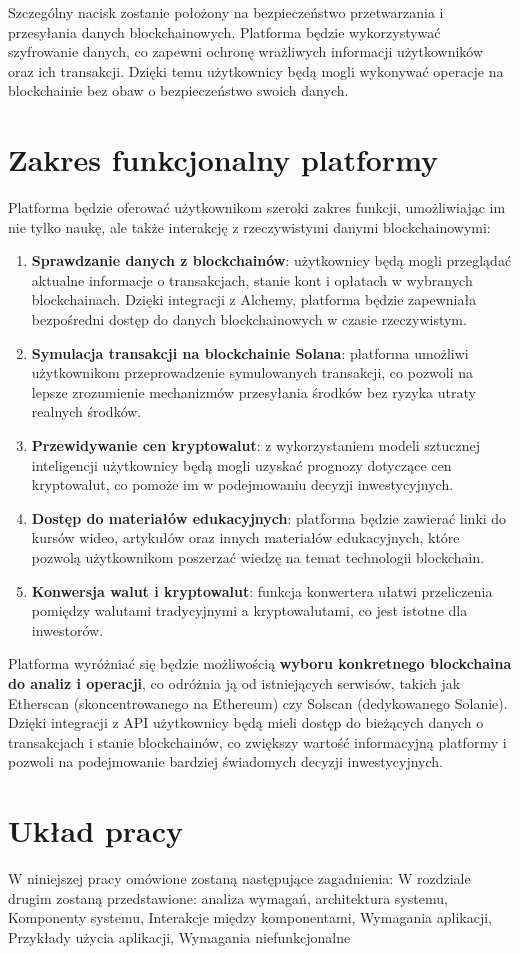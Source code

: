 Szczególny nacisk zostanie położony na bezpieczeństwo przetwarzania i przesyłania danych blockchainowych. Platforma będzie wykorzystywać szyfrowanie danych, co zapewni ochronę wrażliwych informacji użytkowników oraz ich transakcji. Dzięki temu użytkownicy będą mogli wykonywać operacje na blockchainie bez obaw o bezpieczeństwo swoich danych.

\section{Zakres funkcjonalny platformy}

Platforma będzie oferować użytkownikom szeroki zakres funkcji, umożliwiając im nie tylko naukę, ale także interakcję z rzeczywistymi danymi blockchainowymi:

\begin{enumerate} \item \textbf{Sprawdzanie danych z blockchainów}: użytkownicy będą mogli przeglądać aktualne informacje o transakcjach, stanie kont i opłatach w wybranych blockchainach. Dzięki integracji z Alchemy, platforma będzie zapewniała bezpośredni dostęp do danych blockchainowych w czasie rzeczywistym. \item \textbf{Symulacja transakcji na blockchainie Solana}: platforma umożliwi użytkownikom przeprowadzenie symulowanych transakcji, co pozwoli na lepsze zrozumienie mechanizmów przesyłania środków bez ryzyka utraty realnych środków. \item \textbf{Przewidywanie cen kryptowalut}: z wykorzystaniem modeli sztucznej inteligencji użytkownicy będą mogli uzyskać prognozy dotyczące cen kryptowalut, co pomoże im w podejmowaniu decyzji inwestycyjnych. \item \textbf{Dostęp do materiałów edukacyjnych}: platforma będzie zawierać linki do kursów wideo, artykułów oraz innych materiałów edukacyjnych, które pozwolą użytkownikom poszerzać wiedzę na temat technologii blockchain. \item \textbf{Konwersja walut i kryptowalut}: funkcja konwertera ułatwi przeliczenia pomiędzy walutami tradycyjnymi a kryptowalutami, co jest istotne dla inwestorów. \end{enumerate}

Platforma wyróżniać się będzie możliwością \textbf{wyboru konkretnego blockchaina do analiz i operacji}, co odróżnia ją od istniejących serwisów, takich jak Etherscan (skoncentrowanego na Ethereum) czy Solscan (dedykowanego Solanie). Dzięki integracji z API użytkownicy będą mieli dostęp do bieżących danych o transakcjach i stanie blockchainów, co zwiększy wartość informacyjną platformy i pozwoli na podejmowanie bardziej świadomych decyzji inwestycyjnych.

\section{Układ pracy} W niniejszej pracy omówione zostaną następujące zagadnienia:
W rozdziale drugim zostaną przedstawione: analiza wymagań, architektura systemu, Komponenty systemu, Interakcje między komponentami, Wymagania aplikacji, Przykłady użycia aplikacji, Wymagania niefunkcjonalne